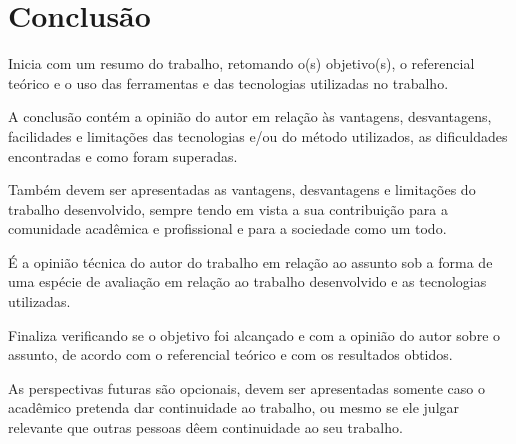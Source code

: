 \chapter{Conclusão}\label{cap:conclusoeseperspectivas}

Inicia com um resumo do trabalho, retomando o(s) objetivo(s), o referencial teórico e o uso das ferramentas e das tecnologias utilizadas no trabalho.

A conclusão contém a opinião do autor em relação às vantagens, desvantagens, facilidades e limitações das tecnologias e/ou do método utilizados, as dificuldades encontradas e como foram superadas.

Também devem ser apresentadas as vantagens, desvantagens e limitações do trabalho desenvolvido, sempre tendo em vista a sua contribuição para a comunidade acadêmica e profissional e para a sociedade como um todo.

É a opinião técnica do autor do trabalho em relação ao assunto sob a forma de uma espécie de avaliação em relação ao trabalho desenvolvido e as tecnologias utilizadas.

Finaliza verificando se o objetivo foi alcançado e com a opinião do autor sobre o assunto, de acordo com o referencial teórico e com os resultados obtidos.

As perspectivas futuras são opcionais, devem ser apresentadas somente caso o acadêmico pretenda dar continuidade ao trabalho, ou mesmo se ele julgar relevante que outras pessoas dêem continuidade ao seu trabalho.

\cite{YouCantSacrificePartitionTolerance}
\cite{PACELCTheorem}